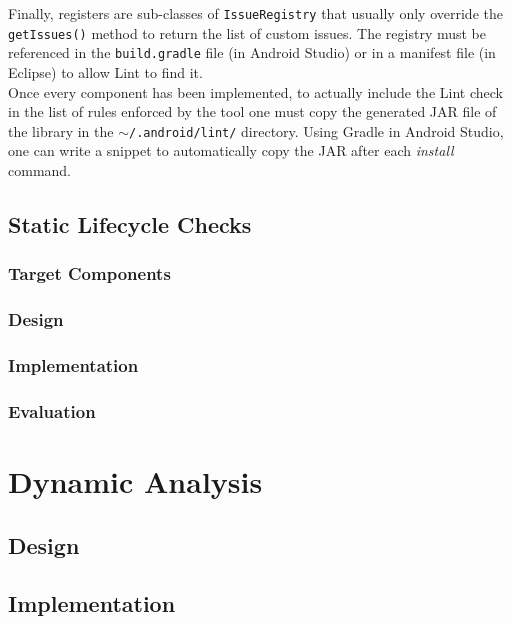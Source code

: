 \documentclass[11pt,a4paper,notitlepage]{article}
\begin{document}
Finally, registers are sub-classes of \texttt{IssueRegistry} that usually only override the \texttt{getIssues()} method to return the list of custom issues. The registry must be referenced in the \texttt{build.gradle} file (in Android Studio) or in a manifest file (in Eclipse) to allow Lint to find it.\bigskip \\
Once every component has been implemented, to actually include the Lint check in the list of rules enforced by the tool one must copy the generated JAR file of the library in the \texttt{$\sim$/.android/lint/} directory. Using Gradle in Android Studio, one can write a snippet to automatically copy the JAR after each \textit{install} command.

\subsection{Static Lifecycle Checks}

\subsubsection{Target Components}

\subsubsection{Design}

\subsubsection{Implementation}

\subsubsection{Evaluation}



\section{Dynamic Analysis}

\subsection{Design}

\subsection{Implementation}
\end{document}
